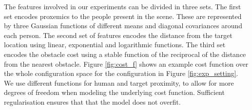\documentclass[a4paper,11pt]{report}
\begin{document}
  The features involved in our experiments can be divided in three sets. The first set encodes proxemics to the people present in the scene. These are represented by three Gaussian functions of different means and diagonal covariances around each person. The second set of features encodes the distance from the target location using linear, exponential and logarithmic functions. The third set encodes the obstacle cost using a stable function of the reciprocal of the distance from the nearest obstacle. Figure \ref{fig:cost_f} shows an example cost function over the whole configuration space for the configuration in Figure \ref{fig:exp_setting}. We use different functions for human and target proximity, to allow for more degrees of freedom when modeling the underlying cost function. Sufficient regularisation ensures that that the model does not overfit.
\end{document}
